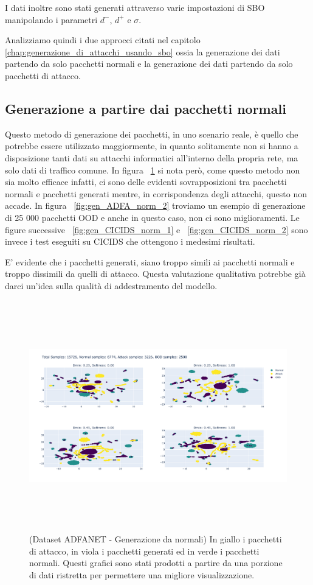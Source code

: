 I dati inoltre sono stati generati attraverso varie impostazioni di SBO manipolando i parametri $d^{-}$, $d^{+}$ e $\sigma$.

Analizziamo quindi i due approcci citati nel capitolo \ref{chap:generazione_di_attacchi_usando_sbo} ossia la generazione dei dati partendo da solo pacchetti normali e la generazione dei dati partendo da solo pacchetti di attacco.

\subsection{Generazione a partire dai pacchetti normali}

Questo metodo di generazione dei pacchetti, in uno scenario reale, è quello che potrebbe essere utilizzato maggiormente, in quanto solitamente non si hanno a disposizione tanti dati su attacchi informatici all'interno della propria rete, ma solo dati di traffico comune. In figura ~\ref{fig:gen_ADFA_norm_1} si nota però, come questo metodo non sia molto efficace infatti, ci sono delle evidenti sovrapposizioni tra pacchetti normali e pacchetti generati mentre, in corrispondenza degli attacchi, questo non accade. In figura ~\ref{fig:gen_ADFA_norm_2} troviamo un esempio di generazione di 25 000 pacchetti OOD e anche in questo caso, non ci sono miglioramenti. Le figure successive ~\ref{fig:gen_CICIDS_norm_1} e ~\ref{fig:gen_CICIDS_norm_2} sono invece i test eseguiti su CICIDS che ottengono i medesimi risultati.

E' evidente che i pacchetti generati, siano troppo simili ai pacchetti normali e troppo dissimili da quelli di attacco. Questa valutazione qualitativa potrebbe già darci un'idea sulla qualità di addestramento del modello.

\begin{figure}[htpb]
    \centering
    \includegraphics[width=\textwidth,height=10cm,keepaspectratio=true]{img/gen_test/adfa/ADFANET_normal_only_reduced_ood.png}
    \caption{
      (Dataset ADFANET - Generazione da normali) In giallo i pacchetti di attacco, in viola i pacchetti generati ed in verde i pacchetti normali. Questi grafici sono stati prodotti a partire da una porzione di dati ristretta per permettere una migliore visualizzazione.
    }
    \label{fig:gen_ADFA_norm_1}
\end{figure}


